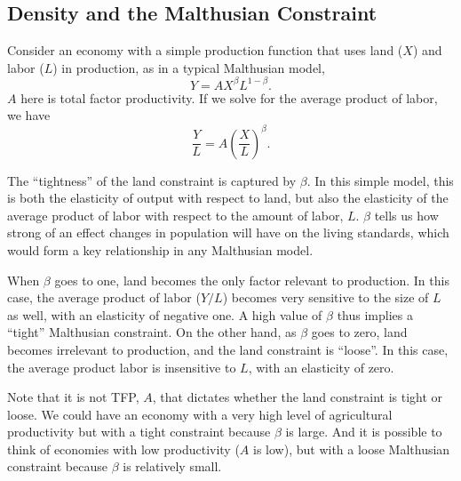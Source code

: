 \documentclass[11pt]{article}
\begin{document}
\subsection{Density and the Malthusian Constraint}
Consider an economy with a simple production function that uses land ($X$) and labor ($L$) in production, as in a typical Malthusian model,
\begin{equation}
Y = A X^\beta L^{1-\beta}.
\end{equation}
$A$ here is total factor productivity. If we solve for the average product of labor, we have
\begin{equation}
    \frac{Y}{L} = A \left(\frac{X}{L}\right)^{\beta}.
\end{equation}

The ``tightness'' of the land constraint is captured by $\beta$. In this simple model, this is both the elasticity of output with respect to land, but also the elasticity of the average product of labor with respect to the amount of labor, $L$. $\beta$ tells us how strong of an effect changes in population will have on the living standards, which would form a key relationship in any Malthusian model.

When $\beta$ goes to one, land becomes the only factor relevant to production. In this case, the average product of labor ($Y/L$) becomes very sensitive to the size of $L$ as well, with an elasticity of negative one. A high value of $\beta$ thus implies a ``tight'' Malthusian constraint. On the other hand, as $\beta$ goes to zero, land becomes irrelevant to production, and the land constraint is ``loose''. In this case, the average product labor is insensitive to $L$, with an elasticity of zero.

Note that it is not TFP, $A$, that dictates whether the land constraint is tight or loose. We could have an economy with a very high level of agricultural productivity but with a tight constraint because $\beta$ is large. And it is possible to think of economies with low productivity ($A$ is low), but with a loose Malthusian constraint because $\beta$ is relatively small.
\end{document}
